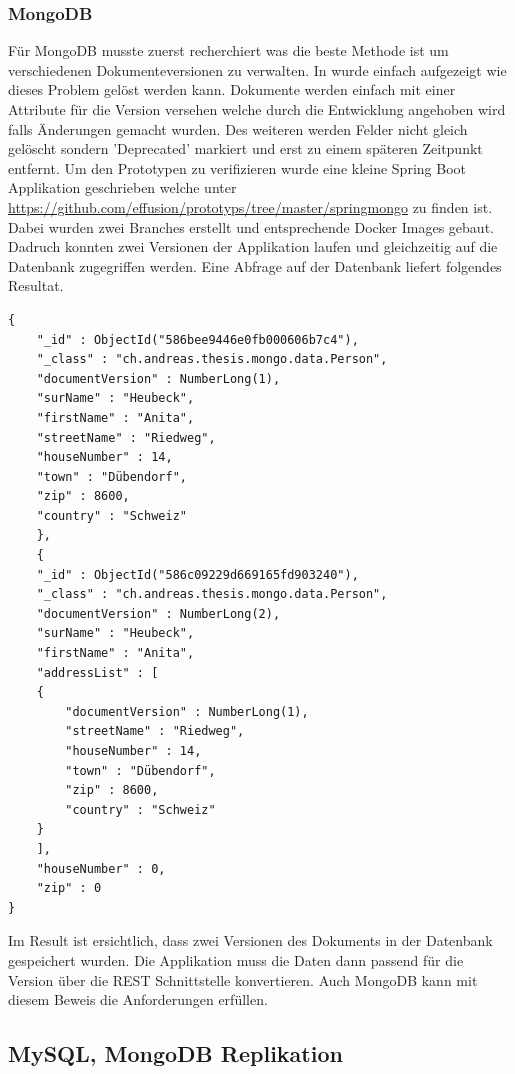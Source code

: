 \subsubsection{MongoDB}

Für MongoDB musste zuerst recherchiert was die beste Methode ist um verschiedenen Dokumenteversionen zu verwalten. In \cite{mongoschema} wurde einfach aufgezeigt wie dieses Problem gelöst werden kann. Dokumente werden einfach mit einer Attribute für die Version versehen welche durch die Entwicklung angehoben wird falls Änderungen gemacht wurden. Des weiteren werden Felder nicht gleich gelöscht sondern 'Deprecated' markiert und erst zu einem späteren Zeitpunkt entfernt. Um den Prototypen zu verifizieren wurde eine kleine Spring Boot Applikation geschrieben welche unter \url{https://github.com/effusion/prototyps/tree/master/springmongo} zu finden ist. Dabei wurden zwei Branches erstellt und entsprechende Docker Images gebaut. Dadruch konnten zwei Versionen der Applikation laufen und gleichzeitig auf die Datenbank zugegriffen werden. 
Eine Abfrage auf der Datenbank liefert folgendes Resultat.


\begin{lstlisting}
{
	"_id" : ObjectId("586bee9446e0fb000606b7c4"),
	"_class" : "ch.andreas.thesis.mongo.data.Person",
	"documentVersion" : NumberLong(1),
	"surName" : "Heubeck",
	"firstName" : "Anita",
	"streetName" : "Riedweg",
	"houseNumber" : 14,
	"town" : "Dübendorf",
	"zip" : 8600,
	"country" : "Schweiz"
	},
	{
	"_id" : ObjectId("586c09229d669165fd903240"),
	"_class" : "ch.andreas.thesis.mongo.data.Person",
	"documentVersion" : NumberLong(2),
	"surName" : "Heubeck",
	"firstName" : "Anita",
	"addressList" : [
	{
		"documentVersion" : NumberLong(1),
		"streetName" : "Riedweg",
		"houseNumber" : 14,
		"town" : "Dübendorf",
		"zip" : 8600,
		"country" : "Schweiz"
	}	
	],
	"houseNumber" : 0,
	"zip" : 0
}
\end{lstlisting}
Im Result ist ersichtlich, dass zwei Versionen des Dokuments in der Datenbank gespeichert wurden. Die Applikation muss die Daten dann passend für die Version über die REST Schnittstelle konvertieren. Auch MongoDB kann mit diesem Beweis die Anforderungen erfüllen.

\subsection{MySQL, MongoDB Replikation}

